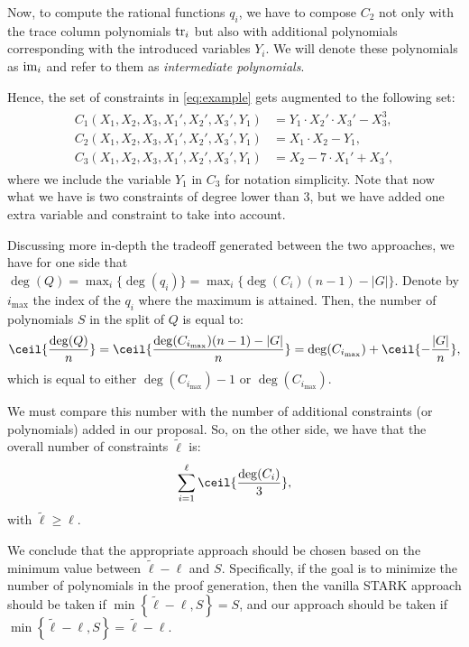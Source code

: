 Now, to compute the rational functions $q_i$, we have to compose $C_2$ not only with the trace column polynomials $\text{tr}_i$ but also with additional polynomials corresponding with the introduced variables $Y_i$. We will denote these polynomials as $\text{im}_i$ and refer to them as \textit{intermediate polynomials}.

Hence, the set of constraints in \eqref{eq:example} gets augmented to the following set:
\begin{align*}
\begin{split}
  C_1(X_1,X_2,X_3,X_1',X_2',X_3',Y_1) &= Y_1 \cdot X_2' \cdot X_3' - X_3^3, \\[0.2cm]
  C_2(X_1,X_2,X_3,X_1',X_2',X_3',Y_1) &= X_1 \cdot X_2 - Y_1, \\[0.2cm]
  C_3(X_1,X_2,X_3,X_1',X_2',X_3',Y_1) &= X_2 -7 \cdot X_1' + X_3',
\end{split}
\end{align*}
where we include the variable $Y_1$ in $C_3$ for notation simplicity. Note that now what we have is two constraints of degree lower than $3$, but we have added one extra variable and constraint to take into account.

Discussing more in-depth the tradeoff generated between the two approaches, we have for one side that $\deg(Q) = \max_i\{\deg(q_i)\} = \max_i\{\deg(C_i)(n-1)-|G|\}$. Denote by $i_{\text{max}}$ the index of the $q_i$ where the maximum is attained. Then, the number of polynomials $S$ in the split of $Q$ is equal to:
\[
\ceil{\frac{\deg(Q)}{n}} = \ceil{\frac{\deg(C_{i_{\text{max}}})(n-1)-|G|}{n}} = \deg(C_{i_{\text{max}}}) + \ceil{-\frac{|G|}{n}},
\]
which is equal to either $\deg(C_{i_{\text{max}}})-1$ or $\deg(C_{i_{\text{max}}})$.

We must compare this number with the number of additional constraints (or polynomials) added in our proposal. So, on the other side, we have that the overall number of constraints $\tilde{\ell}$ is:
\[
\sum_{i=1}^{\ell} \ceil{\frac{\deg(C_i)}{3}},
\]
with $\tilde{\ell} \geq \ell$.

We conclude that the appropriate approach should be chosen based on the minimum value between $\tilde{\ell}-\ell$ and $S$. Specifically, if the goal is to minimize the number of polynomials in the proof generation, then the vanilla STARK approach should be taken if $\min\left\{\tilde{\ell}-\ell, S\right\} = S$, and our approach should be taken if $\min\left\{\tilde{\ell}-\ell, S\right\} = \tilde{\ell}-\ell$.

